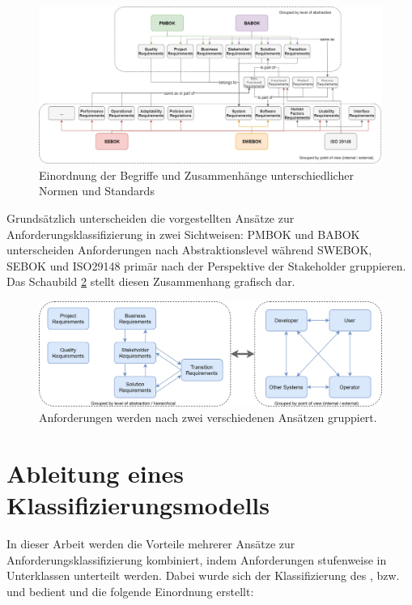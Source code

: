 \begin{figure}[htbp]
 \centering
 \includegraphics[width=1.0\textwidth]{gfx/Requirements.png}
 \caption{Einordnung der Begriffe und Zusammenhänge unterschiedlicher Normen und Standards}
 \label{fig:chapter05:requirements}
\end{figure}

Grundsätzlich unterscheiden die vorgestellten Ansätze zur Anforderungsklassifizierung in zwei Sichtweisen: \ac{PMBOK} und \ac{BABOK} unterscheiden Anforderungen nach Abstraktionslevel während \ac{SWEBOK}, \ac{SEBOK} und ISO29148 primär nach der Perspektive der Stakeholder gruppieren. Das Schaubild \ref{fig:chapter05:requirements_grouping} stellt diesen Zusammenhang grafisch dar.

\begin{figure}[htbp]
 \centering
 \includegraphics[width=1.0\textwidth]{gfx/Requirements_Grouping.png}
 \caption{Anforderungen werden nach zwei verschiedenen Ansätzen gruppiert.}
 \label{fig:chapter05:requirements_grouping}
\end{figure}

\section{Ableitung eines Klassifizierungsmodells}
\label{sec:requirements:model}

In dieser Arbeit werden die Vorteile mehrerer Ansätze zur Anforderungsklassifizierung kombiniert, indem Anforderungen stufenweise in Unterklassen unterteilt werden. Dabei wurde sich der Klassifizierung des \cite{SWEBOK}, \cite{PMBOK} bzw. \cite{BABOK} und \cite{ISO25010} bedient und die folgende Einordnung erstellt:

